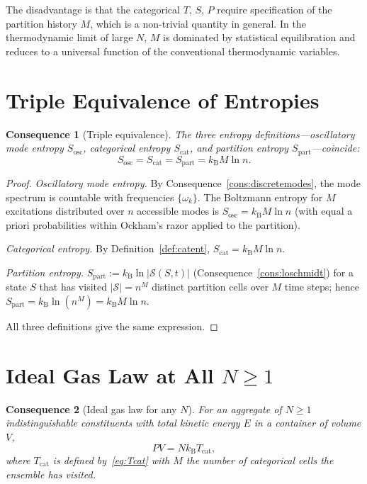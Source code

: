 \documentclass[11pt,twocolumn,a4paper]{article}
\theoremstyle{axiomstyle}
\theoremstyle{conseqstyle}
\newtheorem{consequence}{Consequence}
\theoremstyle{definition}
\theoremstyle{remark}
\newcommand{\kB}{k_{\mathrm{B}}}
\newcommand{\Sk}{S_{\mathrm{osc}}}
\newcommand{\St}{S_{\mathrm{cat}}}
\newcommand{\Se}{S_{\mathrm{part}}}
\newcommand{\Sspace}{\mathcal{S}}
\begin{document}
The disadvantage is that the categorical $T$, $S$, $P$ require specification of the partition history $M$, which is a non-trivial quantity in general. In the thermodynamic limit of large $N$, $M$ is dominated by statistical equilibration and reduces to a universal function of the conventional thermodynamic variables.

\section{Triple Equivalence of Entropies}
\label{sec:tripleent}

\begin{consequence}[Triple equivalence]
\label{cons:tripleent}
The three entropy definitions---oscillatory mode entropy $\Sk$, categorical entropy $\St$, and partition entropy $\Se$---coincide:
\begin{equation}
\Sk=\St=\Se=\kB M\ln n.
\label{eq:triple}
\end{equation}
\end{consequence}

\begin{proof}
\emph{Oscillatory mode entropy.} By Consequence~\ref{cons:discretemodes}, the mode spectrum is countable with frequencies $\{\omega_{k}\}$. The Boltzmann entropy for $M$ excitations distributed over $n$ accessible modes is $\Sk=\kB M\ln n$ (with equal a priori probabilities within Ockham's razor applied to the partition).

\emph{Categorical entropy.} By Definition~\ref{def:catent}, $\St=\kB M\ln n$.

\emph{Partition entropy.} $\Se:=\kB\ln|\Sspace(S,t)|$ (Consequence~\ref{cons:loschmidt}) for a state $S$ that has visited $|\Sspace|=n^{M}$ distinct partition cells over $M$ time steps; hence $\Se=\kB\ln(n^{M})=\kB M\ln n$.

All three definitions give the same expression.
\end{proof}

\section{Ideal Gas Law at All $N\geq 1$}
\label{sec:idealgasN}

\begin{consequence}[Ideal gas law for any $N$]
\label{cons:idealgasN}
For an aggregate of $N\ge 1$ indistinguishable constituents with total kinetic energy $E$ in a container of volume $V$,
\begin{equation}
PV=N\kB T_{\mathrm{cat}},
\label{eq:idealgas}
\end{equation}
where $T_{\mathrm{cat}}$ is defined by~\eqref{eq:Tcat} with $M$ the number of categorical cells the ensemble has visited.
\end{consequence}
\end{document}
